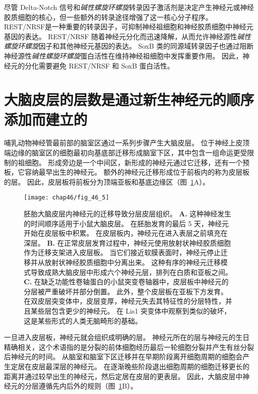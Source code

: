 尽管 Delta-Notch 信号和\textit{碱性螺旋环螺旋}转录因子激活剂是决定产生神经元或神经胶质细胞的核心，但一些额外的转录途径增强了这一核心分子程序。
 REST/NRSF是一种重要的转录因子，可抑制神经祖细胞和神经胶质细胞中神经元基因的表达。
REST/NRSF 随着神经元分化而迅速降解，从而允许神经源性\textit{碱性螺旋环螺旋}因子和其他神经元基因的表达。
SoxB 类的同源域转录因子也通过阻断神经源性\textit{碱性螺旋环螺旋}蛋白活性在维持神经祖细胞中发挥重要作用。
因此，神经元的分化需要避免 REST/NRSF 和 SoxB 蛋白活性。



\section{大脑皮层的层数是通过新生神经元的顺序添加而建立的}

哺乳动物神经管最前部的脑室区通过一系列步骤产生大脑皮层。
位于神经上皮顶端边缘的脑室区的细胞最初向基底部迁移形成脑室下区，其中包含一组命运更受限制的祖细胞。
形成旁边是一个中间区，新形成的神经元通过它迁移，还有一个预板，它容纳最早出生的神经元。
额外的神经元迁移形成位于前板内的称为皮层板的层。 
因此，皮层板将前板分为顶端亚板和基底边缘区（图~\ref{fig:46_5}A）。


\begin{figure}[htbp]
	\centering
	\texttt{[image: chap46/fig\_46\_5]}
	\caption{胚胎大脑皮层内神经元的迁移导致分层皮层组织\cite{olson2002smooth}。
		\textbf{A.} 这种神经发生的时间顺序适用于小鼠大脑皮层。
		在胚胎发育的最后 5 天，神经元开始在皮层板中积累。
		在皮层板内，神经元在进入表层之前填充在深层。 
		\textbf{B.} 在正常皮层发育过程中，神经元使用放射状神经胶质细胞作为迁移支架进入皮层板。
		当它们接近软膜表面时，神经元停止迁移并从放射状神经胶质细胞中分离出来。
		这种有序的神经元迁移模式导致成熟大脑皮层中形成六个神经元层，排列在白质和亚板之间。
		\textbf{C.} 在缺乏功能性卷轴蛋白的小鼠突变卷轴器中，皮层板中神经元的分层被严重破坏并部分倒置。
		此外，整个皮层板在亚板下方发育。
		在双皮层突变体中，皮层变厚，神经元失去其特征性的分层特性，并且某些层包含更少的神经元。
		在 Lis1 突变体中观察到类似的破坏，这是某些形式的人类无脑畸形的基础。}
	\label{fig:46_5}
\end{figure}


一旦进入皮层板，神经元就会组织成明确的层。
神经元所在的层与神经元的生日精确相关，这个术语指的是分裂的前体细胞经历最后一轮细胞分裂并产生有丝分裂后神经元的时间。
从脑室和脑室下区迁移并在早期阶段离开细胞周期的细胞会产生定居在皮层最深层的神经元。
在逐渐晚些阶段退出细胞周期的细胞迁移更长的距离并通过较早出生的神经元，然后定居在皮层的更表层。
因此，大脑皮层中神经元的分层遵循先内后外的规则（图~\ref{fig:46_5}B）。



